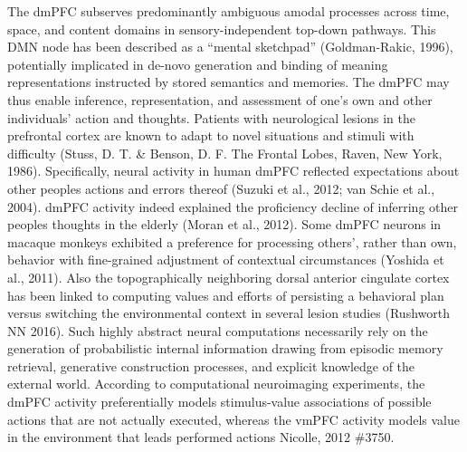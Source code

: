 \documentclass{article} %
\begin{document}
The dmPFC subserves predominantly ambiguous amodal processes
across time, space, and content domains in
sensory-independent top-down pathways.
This DMN node has been described as a “mental sketchpad” (Goldman-Rakic, 1996),
potentially implicated in de-novo generation and binding
of meaning representations instructed by stored semantics and memories.
%
The dmPFC may thus enable inference, representation, and assessment
of one's own and other individuals' action and thoughts.
Patients with neurological lesions in the prefrontal cortex
are known to adapt to novel situations and stimuli with difficulty
(Stuss, D. T. \& Benson, D. F. The Frontal Lobes, Raven, New York, 1986).
Specifically, neural activity in human dmPFC
reflected expectations about other peoples actions and errors thereof
(Suzuki et al., 2012; van Schie et al., 2004).
dmPFC activity indeed explained the proficiency decline
of inferring other peoples thoughts in the elderly (Moran et al., 2012).
Some dmPFC neurons in macaque monkeys exhibited a preference
for processing others', rather than own, behavior
with fine-grained adjustment of contextual circumstances (Yoshida et al., 2011).
Also the topographically neighboring dorsal anterior cingulate cortex
has been linked to computing values and efforts of
persisting a behavioral plan versus switching the
environmental context in several lesion studies (Rushworth NN 2016).
%
Such highly abstract neural computations necessarily rely on the
generation of probabilistic internal information drawing from
episodic memory retrieval, generative construction processes,
and explicit knowledge of the external world.
%
According to computational neuroimaging experiments,
the dmPFC activity preferentially models stimulus-value associations of
possible actions that are not actually executed,
whereas the vmPFC activity models value in the environment that leads performed actions
{Nicolle, 2012 \#3750}.
\end{document}
